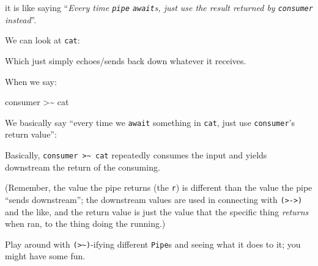 \documentclass[]{article}
\newenvironment{Shaded}{}{}
\newcommand{\DataTypeTok}[1]{\textcolor[rgb]{0.56,0.13,0.00}{#1}}
\newcommand{\KeywordTok}[1]{\textcolor[rgb]{0.00,0.44,0.13}{\textbf{#1}}}
\newcommand{\NormalTok}[1]{#1}
\newcommand{\OperatorTok}[1]{\textcolor[rgb]{0.40,0.40,0.40}{#1}}
\newcommand{\OtherTok}[1]{\textcolor[rgb]{0.00,0.44,0.13}{#1}}
\begin{document}
it is like saying ``\emph{Every time \texttt{pipe} \texttt{await}s, just use the
result returned by \texttt{consumer} instead}''.

We can look at \texttt{cat}:

\begin{Shaded}
\end{Shaded}

Which just simply echoes/sends back down whatever it receives.

When we say:

\begin{Shaded}
\begin{Highlighting}[]
\NormalTok{consumer }\OperatorTok{\textgreater{}\textasciitilde{}}\NormalTok{ cat}
\end{Highlighting}
\end{Shaded}

We basically say ``every time we \texttt{await} something in \texttt{cat}, just
use \texttt{consumer}'s return value'':

\begin{Shaded}
\end{Shaded}

Basically, \texttt{consumer\ \textgreater{}\textasciitilde{}\ cat} repeatedly
consumes the input and yields downstream the return of the consuming.

(Remember, the value the pipe returns (the \texttt{r}) is different than the
value the pipe ``sends downstream''; the downstream values are used in
connecting with \texttt{(\textgreater{}-\textgreater{})} and the like, and the
return value is just the value that the specific thing \emph{returns} when ran,
to the thing doing the running.)

Play around with \texttt{(\textgreater{}\textasciitilde{})}-ifying different
\texttt{Pipe}s and seeing what it does to it; you might have some fun.
\end{document}
